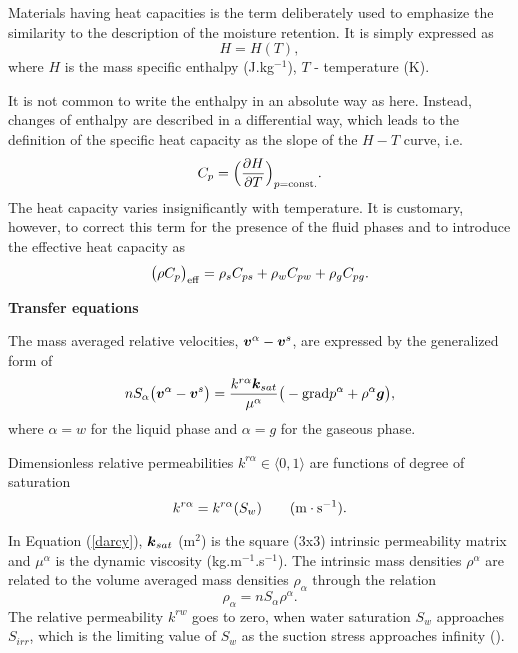 Materials having heat capacities is the term deliberately used 
to emphasize the similarity to the description of the moisture retention. It is simply expressed as
\begin{equation}
H =H(T),
\end{equation}
where $H$ is the mass specific enthalpy (J.kg$^{-1}$), $T$ - temperature (K).

It is not common to write the enthalpy in an absolute way as here. Instead, changes of enthalpy are 
described in a differential way, which leads to the definition of the specific heat capacity as the slope 
of the $H - T$ curve, i.e.
\begin{equation}\label{cap}
C_p = \Big( \frac{\partial H}{\partial T}\Big)_{p={\rm const.}}.
\end{equation}
The heat capacity varies insignificantly with temperature. It is customary, however, to correct this term 
for the presence of the fluid phases and to introduce the effective heat capacity as
\begin{equation}
\big( \rho C_p \big)_{\rm eff} = \rho_s C_{ps} + \rho_w C_{pw} + \rho_g C_{pg}.
\end{equation}

{\bf Transfer equations}

The mass averaged relative velocities, $\mbox{\boldmath$v$} ^{\alpha} - \mbox{\boldmath$v$} ^s$, are expressed 
by the generalized form of {} \cite{lewis}
\begin{equation}\label{darcy}
n S_{\alpha} \big( \mbox{\boldmath$v$} ^{\alpha} - \mbox{\boldmath$v$} ^s \big) = \frac{k^{r\alpha} \mbox{\boldmath$k$}_{sat}}
{\mu^{\alpha}} \big( - {\rm grad} p^{\alpha} + \rho^{\alpha} \mbox{\boldmath$g$} \big),
\end{equation}
where $\alpha = w$ for the liquid phase and $\alpha = g$ for the gaseous phase.

Dimensionless relative permeabilities $k^{r\alpha} \in \langle 0,1 \rangle$ are functions of degree of~
saturation
\begin{equation}
k^{r\alpha} = k^{r\alpha} (S_w)\qquad ({\rm m \cdot s}^{-1}).
\end{equation}

In Equation (\ref{darcy}), $\mbox{\boldmath$k$}_{sat}$ (m$^2$) is the square (3x3) intrinsic permeability matrix 
 and $\mu^{\alpha}$ is the dynamic viscosity (kg.m$^{-1}$.s$^{-1}$). The intrinsic mass densities $\rho^{\alpha}$ 
are related to the volume averaged mass densities $\rho_{\alpha}$ through the relation
\begin{equation}\label{av_dens}
\rho_{\alpha} = n S_{\alpha} \rho^{\alpha}.
\end{equation}
The relative permeability $k^{rw}$ goes to zero, when water saturation $S_w$ approaches $S_{irr}$, 
which is the limiting value of $S_w$ as the suction stress approaches infinity (\cite{fatt}).

